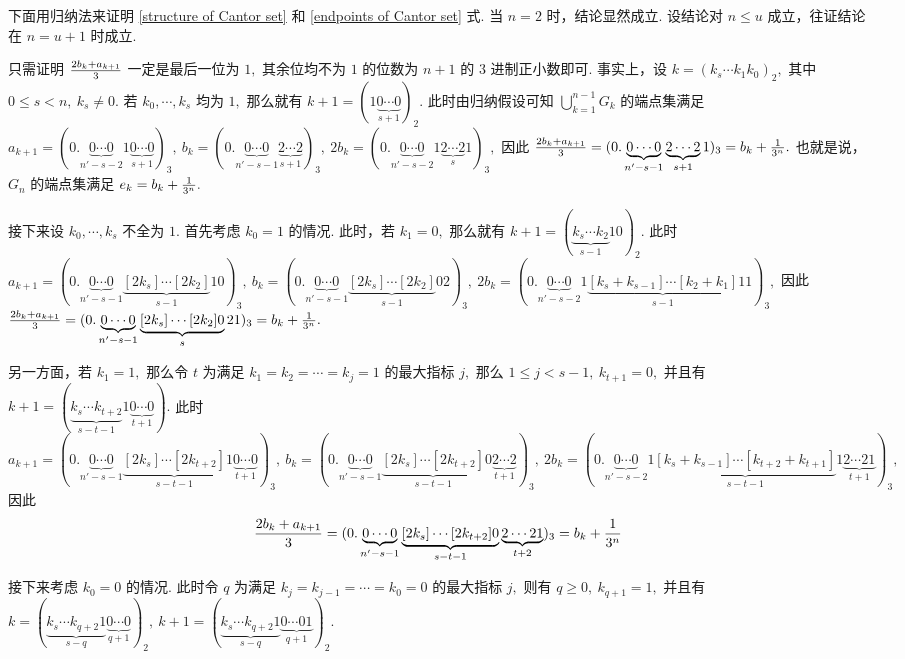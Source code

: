 \documentclass[12pt, a4paper, oneside]{book}
\numberwithin{figure}{section}
\theoremstyle{definition}
\begin{document}
下面用归纳法来证明 \eqref{structure of Cantor set} 和 \eqref{endpoints of Cantor set} 式. 当 $n=2$ 时，结论显然成立. 设结论对 $n\leq u$ 成立，往证结论在 $n=u+1$ 时成立.

只需证明 ${2b_k+a_{k+1}\over 3}$ 一定是最后一位为 $1,$ 其余位均不为 $1$ 的位数为 $n+1$ 的 $3$ 进制正小数即可. 事实上，设 
$k=(k_s\cdots k_1 k_{0})_2,$ 其中 $0\leq s<n,\ k_s\neq 0.$ 若 $k_{0},\cdots,k_s$ 均为 $1,$ 那么就有 $k+1=(1\underbrace{0\cdots 0}_{s+1})_2.$
此时由归纳假设可知 $\bigcup_{k=1}^{n-1}G_k$ 的端点集满足 $a_{k+1}=(0.\underbrace{0\cdots 0}_{n'-s-2}1\underbrace{0\cdots 0}_{s+1})_3,\ b_k=(0.\underbrace{0\cdots 0}_{n'-s-1}\underbrace{2\cdots 2}_{s+1})_3,\ 2b_k=(0.\underbrace{0\cdots 0}_{n'-s-2}1\underbrace{2\cdots 2}_{s}1)_3,$ 因此 
${2b_k+a_{k+1}\over 3}=(0.\underbrace{0\cdots 0}_{n'-s-1}\underbrace{2\cdots 2}_{s+1}1)_3=b_k+{1\over 3^{n}}.$ 
也就是说，$G_n$ 的端点集满足 $e_k=b_k+{1\over 3^n}.$

接下来设 $k_0,\cdots,k_s$ 不全为 $1.$ 首先考虑 $k_0=1$ 的情况. 此时，若 $k_1=0,$
那么就有 $k+1=(\underbrace{k_s\cdots k_2}_{s-1}10)_2.$
此时 $a_{k+1}=(0.\underbrace{0\cdots 0}_{n'-s-1}\underbrace{[2k_s]\cdots [2k_2]}_{s-1}10)_3,\ b_k=(0.\underbrace{0\cdots 0}_{n'-s-1}\underbrace{[2k_s]\cdots [2k_2]}_{s-1}02)_3,\ 2b_k=(0.\underbrace{0\cdots 0}_{n'-s-2}1\underbrace{[k_s+k_{s-1}]\cdots [k_2+k_1]}_{s-1}11)_3,$ 因此 
${2b_k+a_{k+1}\over 3}=(0.\underbrace{0\cdots 0}_{n'-s-1}\underbrace{[2k_s]\cdots [2k_2]0}_{s}21)_3={b_{k}}+{1\over 3^{n}}.$ 

另一方面，若 $k_1=1,$ 那么令 $t$ 为满足 $k_1=k_2=\cdots =k_j=1$ 的最大指标 $j,$ 那么 $1\leq j<s-1,\ k_{t+1}=0,$ 并且有 $k+1=(\underbrace{k_s\cdots k_{t+2}}_{s-t-1}1\underbrace{0\cdots 0}_{t+1}).$
此时 $a_{k+1}=(0.\underbrace{0\cdots 0}_{n'-s-1}\underbrace{[2k_s]\cdots [2k_{t+2}]}_{s-t-1}1\underbrace{0\cdots 0}_{t+1})_3,\ b_k=(0.\underbrace{0\cdots 0}_{n'-s-1}\underbrace{[2k_s]\cdots [2k_{t+2}]}_{s-t-1}0\underbrace{2\cdots 2}_{t+1})_3,\ 2b_k=(0.\underbrace{0\cdots 0}_{n'-s-2}1\underbrace{[k_s+k_{s-1}]\cdots [k_{t+2}+k_{t+1}]}_{s-t-1}1\underbrace{2\cdots 21}_{t+1})_3,$ 因此 
\begin{equation}
    {2b_k+a_{k+1}\over 3}=(0.\underbrace{0\cdots 0}_{n'-s-1}\underbrace{[2k_s]\cdots [2k_{t+2}]0}_{s-t-1}\underbrace{2\cdots 21}_{t+2})_3={b_{k}}+{1\over 3^{n}}
\end{equation}


接下来考虑 $k_0=0$ 的情况. 此时令 $q$ 为满足 $k_j=k_{j-1}=\cdots=k_0=0$ 的最大指标 $j,$ 则有 $q\geq 0,\ k_{q+1}=1,$ 并且有 $k=(\underbrace{k_s\cdots k_{q+2} 1}_{s-q}\underbrace{0\cdots 0}_{q+1})_2,\ k+1=(\underbrace{k_s\cdots k_{q+2}1}_{s-q}\underbrace{0\cdots 01}_{q+1})_2.$
\end{document}
